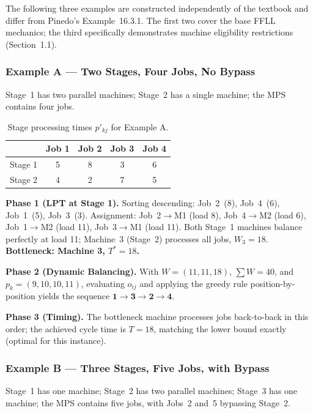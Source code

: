 \documentclass[11pt,a4paper]{article}
\begin{document}
The following three examples are constructed independently of the
textbook and differ from Pinedo's Example~16.3.1. The first two cover
the base FFLL mechanics; the third specifically demonstrates machine
eligibility restrictions (Section~1.1).

\subsubsection*{Example A --- Two Stages, Four Jobs, No Bypass}

Stage~1 has two parallel machines; Stage~2 has a single machine; the MPS
contains four jobs.

\begin{table}[h!]
\centering
\begin{tabular}{@{}lcccc@{}}
\toprule
 & Job 1 & Job 2 & Job 3 & Job 4 \\
\midrule
Stage 1 & 5 & 8 & 3 & 6 \\
Stage 2 & 4 & 2 & 7 & 5 \\
\bottomrule
\end{tabular}
\caption{Stage processing times $p'_{kj}$ for Example A.}
\end{table}

\textbf{Phase 1 (LPT at Stage 1).} Sorting descending: Job~2~(8), Job~4~(6),
Job~1~(5), Job~3~(3). Assignment: Job~2$\to$M1 (load 8), Job~4$\to$M2 (load
6), Job~1$\to$M2 (load 11), Job~3$\to$M1 (load 11). Both Stage~1 machines
balance perfectly at load 11; Machine~3 (Stage~2) processes all jobs,
$W_3 = 18$. \textbf{Bottleneck: Machine 3, $T^\ast = 18$.}

\textbf{Phase 2 (Dynamic Balancing).} With $W=(11,11,18)$, $\sum W = 40$,
and $p_k=(9,10,10,11)$, evaluating $o_{ij}$ and applying the greedy rule
position-by-position yields the sequence $\mathbf{1 \to 3 \to 2 \to 4}$.

\textbf{Phase 3 (Timing).} The bottleneck machine processes jobs
back-to-back in this order; the achieved cycle time is $T = 18$, matching
the lower bound exactly (optimal for this instance).

\subsubsection*{Example B --- Three Stages, Five Jobs, with Bypass}

Stage~1 has one machine; Stage~2 has two parallel machines; Stage~3 has one
machine; the MPS contains five jobs, with Jobs~2 and~5 bypassing Stage~2.
\end{document}
